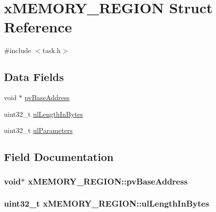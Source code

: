 \hypertarget{structxMEMORY__REGION}{}\section{x\+M\+E\+M\+O\+R\+Y\+\_\+\+R\+E\+G\+I\+ON Struct Reference}
\label{structxMEMORY__REGION}


{\ttfamily \#include $<$task.\+h$>$}

\subsection*{Data Fields}
\begin{DoxyCompactItemize}
\item 
void $\ast$ \hyperlink{structxMEMORY__REGION_a228036bbfdbc38f170e45deadb166172}{pv\+Base\+Address}
\item 
uint32\+\_\+t \hyperlink{structxMEMORY__REGION_a97e59578d3c4c46270d33e7206258a65}{ul\+Length\+In\+Bytes}
\item 
uint32\+\_\+t \hyperlink{structxMEMORY__REGION_a6ba180553e9a318f23acc5f4664934e3}{ul\+Parameters}
\end{DoxyCompactItemize}


\subsection{Field Documentation}
\subsubsection[{\texorpdfstring{pv\+Base\+Address}{pvBaseAddress}}]{\setlength{\rightskip}{0pt plus 5cm}void$\ast$ x\+M\+E\+M\+O\+R\+Y\+\_\+\+R\+E\+G\+I\+O\+N\+::pv\+Base\+Address}\hypertarget{structxMEMORY__REGION_a228036bbfdbc38f170e45deadb166172}{}\label{structxMEMORY__REGION_a228036bbfdbc38f170e45deadb166172}
\subsubsection[{\texorpdfstring{ul\+Length\+In\+Bytes}{ulLengthInBytes}}]{\setlength{\rightskip}{0pt plus 5cm}uint32\+\_\+t x\+M\+E\+M\+O\+R\+Y\+\_\+\+R\+E\+G\+I\+O\+N\+::ul\+Length\+In\+Bytes}\hypertarget{structxMEMORY__REGION_a97e59578d3c4c46270d33e7206258a65}{}\label{structxMEMORY__REGION_a97e59578d3c4c46270d33e7206258a65}

